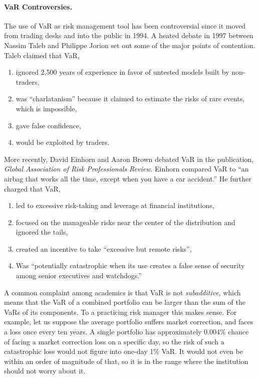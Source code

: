 \paragraph{VaR Controversies.} The use of VaR as risk management tool has been controversial since it moved from trading desks and into the public in 1994. A heated debate in 1997 between Nassim Taleb and Philippe Jorion set out some of the major points of contention. Taleb claimed that VaR,
\begin{enumerate}
\item ignored 2,500 years of experience in favor of untested models built by non-traders,
\item was ``charlatanism'' because it claimed to estimate the risks of rare events, which is impossible,
\item gave false confidence,
\item would be exploited by traders.
\end{enumerate}

More recently, David Einhorn and Aaron Brown debated VaR in the publication, \emph{Global Association of Risk Professionals Review}. Einhorn compared VaR to ``an airbag that works all the time, except when you have a car accident.'' He further charged that VaR,
\begin{enumerate}
\item led to excessive risk-taking and leverage at financial institutions,
\item focused on the manageable risks near the center of the distribution and ignored the tails,
\item created an incentive to take ``excessive but remote risks'',
\item Was ``potentially catastrophic when its use creates a false sense of security among senior executives and watchdogs.''
\end{enumerate}

A common complaint among academics is that VaR is not \emph{subadditive}, which means that the VaR of a combined portfolio can be larger than the sum of the VaRs of its components. To a practicing risk manager this makes sense. For example, let us suppose the average portfolio suffers market correction, and faces a loss once every ten years. A single portfolio has approximately 0.004\% chance of facing a market correction loss on a specific day, so the risk of such a catastrophic loss would not figure into one-day 1\% VaR. It would not even be within an order of magnitude of that, so it is in the range where the institution should not worry about it.

